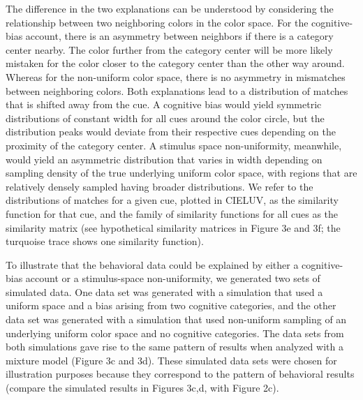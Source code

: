 The difference in the two explanations can be understood by considering the relationship between two neighboring colors in the color space. For the cognitive-bias account, there is an asymmetry between neighbors if there is a category center nearby. The color further from the category center will be more likely mistaken for the color closer to the category center than the other way around. Whereas for the non-uniform color space, there is no asymmetry in mismatches between neighboring colors. Both explanations lead to a distribution of matches that is shifted away from the cue. A cognitive bias would yield symmetric distributions of constant width for all cues around the color circle, but the distribution peaks would deviate from their respective cues depending on the proximity of the category center. A stimulus space non-uniformity, meanwhile, would yield an asymmetric distribution that varies in width depending on sampling density of the true underlying uniform color space, with regions that are relatively densely sampled having broader distributions. We refer to the distributions of matches for a given cue, plotted in CIELUV, as the similarity function for that cue, and the family of similarity functions for all cues as the similarity matrix (see hypothetical similarity matrices in Figure 3e and 3f; the turquoise trace shows one similarity function). 

To illustrate that the behavioral data could be explained by either a cognitive-bias account or a stimulus-space non-uniformity, we generated two sets of simulated data. One data set was generated with a simulation that used a uniform space and a bias arising from two cognitive categories, and the other data set was generated with a simulation that used non-uniform sampling of an underlying uniform color space and no cognitive categories. The data sets from both simulations gave rise to the same pattern of results when analyzed with a mixture model \citep{zhang_discrete_2008, bae_why_2015} (Figure 3c and 3d). These simulated data sets were chosen for illustration purposes because they correspond to the pattern of behavioral results (compare the simulated results in Figures 3c,d, with Figure 2c). 

